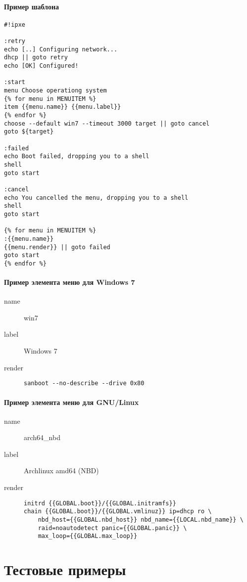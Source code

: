 \documentclass[11pt]{article}
\begin{document}
\paragraph{Пример шаблона}
\begin{verbatim}
#!ipxe

:retry
echo [..] Configuring network...
dhcp || goto retry
echo [OK] Configured!

:start
menu Choose operationg system
{% for menu in MENUITEM %}
item {{menu.name}} {{menu.label}}
{% endfor %}
choose --default win7 --timeout 3000 target || goto cancel
goto ${target}

:failed
echo Boot failed, dropping you to a shell
shell
goto start

:cancel
echo You cancelled the menu, dropping you to a shell
shell
goto start

{% for menu in MENUITEM %}
:{{menu.name}}
{{menu.render}} || goto failed
goto start
{% endfor %}
\end{verbatim}

\paragraph{Пример элемента меню для Windows 7}
\begin{description}
    \item[name] win7
    \item[label] Windows 7
    \item[render] \verb=sanboot --no-describe --drive 0x80=
\end{description}

\paragraph{Пример элемента меню для GNU/Linux}
\begin{description}
    \item[name] arch64\_nbd
    \item[label] Archlinux amd64 (NBD)
    \item[render]
        \begin{verbatim}
initrd {{GLOBAL.boot}}/{{GLOBAL.initramfs}}
chain {{GLOBAL.boot}}/{{GLOBAL.vmlinuz}} ip=dhcp ro \
    nbd_host={{GLOBAL.nbd_host}} nbd_name={{LOCAL.nbd_name}} \
    raid=noautodetect panic={{GLOBAL.panic}} \
    max_loop={{GLOBAL.max_loop}}
        \end{verbatim}
\end{description}

\section{Тестовые примеры}
\end{document}
